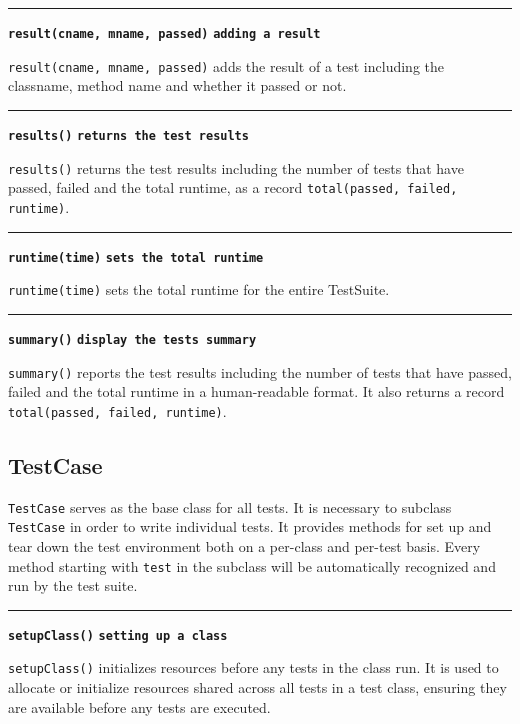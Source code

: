 \documentclass[letterpaper,12pt]{article}
\begin{document}
\bigskip
\hrule\vspace{0.1cm}
\noindent
{\tt\bf result(cname, mname, passed)} \hfill {\tt\bf adding a result}

\vspace{0.1cm}
\noindent
\texttt{result(cname, mname, passed)} adds the result of a test including the classname, method name and whether it passed or not.

\bigskip
\hrule\vspace{0.1cm}
\noindent
{\tt\bf results()} \hfill {\tt\bf returns the test results}

\vspace{0.1cm}
\noindent
\texttt{results()} returns the test results including the number of tests that have passed, failed and the total runtime, as a record \texttt{total(passed, failed, runtime)}.

\bigskip
\hrule\vspace{0.1cm}
\noindent
{\tt\bf runtime(time)} \hfill {\tt\bf sets the total runtime}

\vspace{0.1cm}
\noindent
\texttt{runtime(time)} sets the total runtime for the entire TestSuite.

\bigskip
\hrule\vspace{0.1cm}
\noindent
{\tt\bf summary()} \hfill {\tt\bf display the tests summary}

\vspace{0.1cm}
\noindent
\texttt{summary()} reports the test results including the number of tests that have passed, failed and the total runtime in a human-readable format. It also returns a record \texttt{total(passed, failed, runtime)}.

\subsection{TestCase}

\texttt{TestCase} serves as the base class for all tests. It is necessary to subclass \texttt{TestCase} in order to write individual tests. It provides methods for set up and tear down the test environment both on a per-class and per-test basis. Every method starting with \texttt{test} in the subclass will be automatically recognized and run by the test suite.

\bigskip
\hrule\vspace{0.1cm}
\noindent
{\tt\bf setupClass()} \hfill {\tt\bf setting up a class}

\vspace{0.1cm}
\noindent
\texttt{setupClass()} initializes resources before any tests in the class run. It is used to allocate or initialize resources shared across all tests in a test class, ensuring they are available before any tests are executed.
\end{document}
